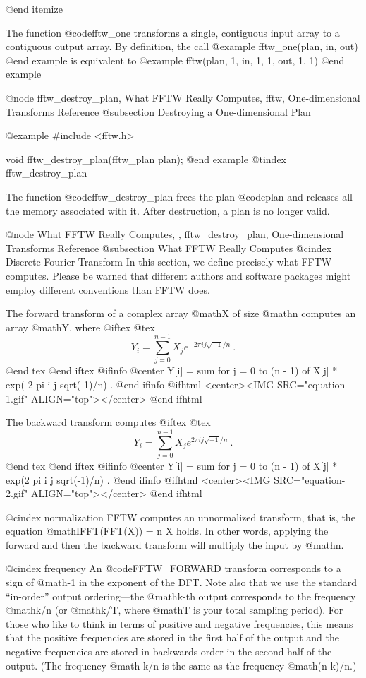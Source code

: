 @end itemize

The function @code{fftw_one} transforms a single, contiguous input array
to a contiguous output array.  By definition, the call
@example
fftw_one(plan, in, out)
@end example
is equivalent to
@example
fftw(plan, 1, in, 1, 1, out, 1, 1)
@end example

@node    fftw_destroy_plan, What FFTW Really Computes, fftw, One-dimensional Transforms Reference
@subsection Destroying a One-dimensional Plan

@example
#include <fftw.h>

void fftw_destroy_plan(fftw_plan plan);
@end example
@tindex fftw_destroy_plan

The function @code{fftw_destroy_plan} frees the plan @code{plan} and
releases all the memory associated with it.  After destruction, a plan
is no longer valid.

@node What FFTW Really Computes,  , fftw_destroy_plan, One-dimensional Transforms Reference
@subsection What FFTW Really Computes
@cindex Discrete Fourier Transform
In this section, we define precisely what FFTW computes.  Please be
warned that different authors and software packages might employ
different conventions than FFTW does.

The forward transform of a complex array @math{X} of size
@math{n} computes an array @math{Y}, where
@iftex
@tex
$$
Y_i = \sum_{j = 0}^{n - 1} X_j e^{-2\pi i j \sqrt{-1}/n} \ .
$$
@end tex
@end iftex
@ifinfo
@center Y[i] = sum for j = 0 to (n - 1) of X[j] * exp(-2 pi i j sqrt(-1)/n) .
@end ifinfo
@ifhtml
<center><IMG SRC="equation-1.gif" ALIGN="top"></center>
@end ifhtml

The backward transform computes
@iftex
@tex
$$
Y_i = \sum_{j = 0}^{n - 1} X_j e^{2\pi i j \sqrt{-1}/n} \ .
$$
@end tex
@end iftex
@ifinfo
@center Y[i] = sum for j = 0 to (n - 1) of X[j] * exp(2 pi i j sqrt(-1)/n) .
@end ifinfo
@ifhtml
<center><IMG SRC="equation-2.gif" ALIGN="top"></center>
@end ifhtml

@cindex normalization
FFTW computes an unnormalized transform, that is, the equation
@math{IFFT(FFT(X)) = n X} holds.  In other words, applying the forward
and then the backward transform will multiply the input by @math{n}.

@cindex frequency
An @code{FFTW_FORWARD} transform corresponds to a sign of @math{-1} in
the exponent of the DFT.  Note also that we use the standard
``in-order'' output ordering---the @math{k}-th output corresponds to the
frequency @math{k/n} (or @math{k/T}, where @math{T} is your total
sampling period).  For those who like to think in terms of positive and
negative frequencies, this means that the positive frequencies are
stored in the first half of the output and the negative frequencies are
stored in backwards order in the second half of the output.  (The
frequency @math{-k/n} is the same as the frequency @math{(n-k)/n}.)

